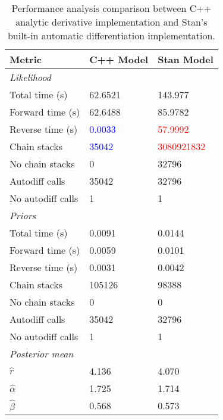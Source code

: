 \documentclass[11pt]{article}
\begin{document}
\begin{table}[h!]
\tabcolsep=0.4cm
\begin{longtable}{lll}
    \toprule
    \textbf{Metric} & \textbf{C++ Model} & \textbf{Stan Model} \\
    \midrule
    \endfirsthead
 	
    \multicolumn{3}{l}{\textit{Likelihood}} \\
    Total time (s) & 62.6521 & 143.977 \\
    Forward time (s) & 62.6488 & 85.9782 \\
    Reverse time (s) & \textcolor{blue}{0.0033} & \textcolor{red}{57.9992} \\
    Chain stacks & \textcolor{blue}{35042} & \textcolor{red}{3080921832} \\
    No chain stacks & 0 & 32796 \\
    Autodiff calls & 35042 & 32796 \\
    No autodiff calls & 1 & 1 \\
    \midrule
    \multicolumn{3}{l}{\textit{Priors}} \\
    Total time (s) & 0.0091 & 0.0144 \\
    Forward time (s) & 0.0059 & 0.0101 \\
    Reverse time (s) & 0.0031 & 0.0042 \\
    Chain stacks & 105126 & 98388 \\
    No chain stacks & 0 & 0 \\
    Autodiff calls & 35042 & 32796 \\
    No autodiff calls & 1 & 1 \\
    \midrule
    \multicolumn{3}{l}{\textit{Posterior mean}} \\
    $\hat r$  & 4.136 & 4.070 \\
    $\hat \alpha$ & 1.725 & 1.714 \\
    $\hat \beta$ & 0.568 & 0.573 \\
    \bottomrule
\end{longtable}
\caption{Performance analysis comparison between C++ analytic derivative implementation and Stan's built-in automatic differentiation implementation.}
\end{table}

















\clearpage

 
\end{document}
